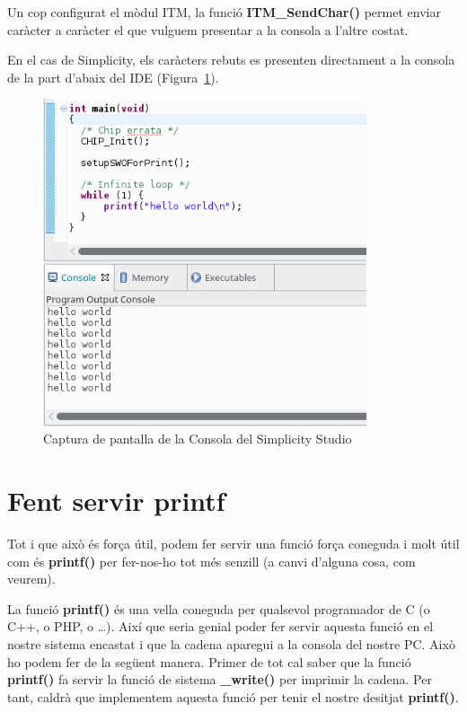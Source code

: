 Un cop configurat el mòdul ITM, la funció {\bf ITM\_SendChar()} permet enviar caràcter a caràcter el que vulguem presentar a la consola a l'altre costat.

En el cas de Simplicity, els caràcters rebuts es presenten directament a la consola de la part d'abaix del \gls{IDE} (Figura~\ref{fig:ITM}).

\begin{figure}
 \centering
 \includegraphics[width=0.85\textwidth, keepaspectratio]{imatges/ITM_Debug.png}
 \caption{Captura de pantalla de la Consola del Simplicity Studio}
 \label{fig:ITM}
\end{figure}

\chapter{Fent servir printf}
\label{sub:console_example}
Tot i que això és força útil, podem fer servir una funció força coneguda i molt útil com és {\bf printf()} per fer-nos-ho tot més senzill (a canvi d'alguna cosa, com veurem).

La funció {\bf printf()} és una vella coneguda per qualsevol programador de C (o C++, o PHP, o …). Així que seria genial poder fer servir aquesta funció en el nostre sistema encastat i que la cadena aparegui a la consola del nostre PC. Això ho podem fer de la següent manera. Primer de tot cal saber que la funció {\bf printf()} fa servir la funció de sistema {\bf \_write()} per imprimir la cadena. Per tant, caldrà que implementem aquesta funció per tenir el nostre desitjat {\bf printf()}.

